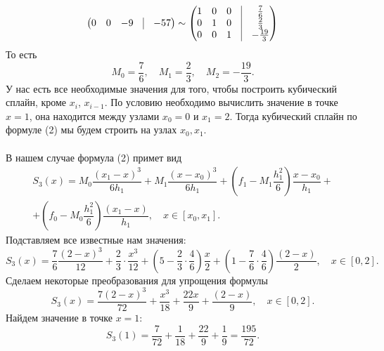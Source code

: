 \documentclass[a4paper, 12pt]{article}
\begin{document}
\begin{enumerate}
$$\begin{pmatrix}
			0&0&-9&\vline&-57
		\end{pmatrix}
		\sim
		\begin{pmatrix}
			1&0&0&\vline&\frac76\\
			0&1&0&\vline&\frac{2}{3}\\
			0&0&1&\vline&-\frac{19}{3}
		\end{pmatrix}$$
		То есть $$M_0 = \dfrac76,\quad M_1 = \dfrac23,\quad M_2 = -\dfrac{19}{3}.$$
		У нас есть все необходимые значения для того, чтобы построить кубический сплайн, кроме $x_i$, $x_{i-1}$. По условию необходимо вычислить значение в точке $x=1$, она находится между узлами $x_0 = 0$ и $x_1 = 2$. Тогда кубический сплайн по формуле (2) мы будем строить на узлах $x_0, x_1$.\\\\
		В нашем случае формула (2) примет вид \begin{multline*}
			S_3(x) = M_0\dfrac{(x_1 - x)^3}{6h_1} + M_{1}\dfrac{(x-x_0)^3}{6h_1} + \left(f_1 - M_1\dfrac{h_1^2}{6}\right)\dfrac{x-x_0}{h_1} +\\+ \left(f_0 - M_0\dfrac{h_1^2}{6}\right)\dfrac{(x_1 - x)}{h_1},\quad x\in [x_0, x_1].
		\end{multline*}
		Подставляем все известные нам значения:
		$$
		S_3(x) = \dfrac76\dfrac{(2 - x)^3}{12} + \dfrac23\cdot\dfrac{x^3}{12} + \left(5 - \dfrac23\cdot\dfrac{4}{6}\right)\dfrac{x}{2} + \left(1 - \dfrac76\cdot\dfrac{4}{6}\right)\dfrac{(2 - x)}{2},\quad x\in [0, 2].
		$$
		Сделаем некоторые преобразования для упрощения формулы
		$$
		S_3(x) = \dfrac{7(2 - x)^3}{72} + \dfrac{x^3}{18} + \dfrac{22x}{9} + \dfrac{(2 - x)}{9},\quad x\in [0, 2].
		$$
		Найдем значение в точке $x=1$:
		$$
		S_3(1) = \dfrac{7}{72} + \dfrac{1}{18} + \dfrac{22}{9} + \dfrac{1}{9} = \dfrac{195}{72}.
		$$
	\end{enumerate}
\end{document}
